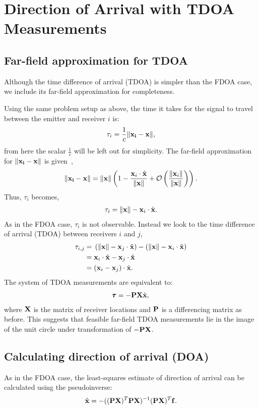 \section{Direction of Arrival with TDOA Measurements}
\label{s:TDOA}
\subsection{Far-field approximation for TDOA}
Although the time difference of arrival (TDOA) is simpler than the FDOA case, we include its far-field approximation for completeness.

Using the same problem setup as above, the time it takes for the signal to travel between the emitter and receiver $i$ is:
\begin{align*}
  \tau_{i} = \frac{1}{c}\|\mathbf{x_i}-\mathbf{x}\|,
\end{align*}
from here the scalar $\frac{1}{c}$ will be left out for simplicity.
The far-field approximation for $\|\mathbf{x_i}-\mathbf{x}\|$ is given~\cite{Cheney2009},
\begin{align*}
  \|\mathbf{x_i}-\mathbf{x}\|=\|\mathbf{x}\|\left(1-\frac{\mathbf{x}_i\cdot\hat{\mathbf{x}}}{\|\mathbf{x}\|}+\mathcal{O}\left( \frac{\|\mathbf{x}_i\|}{\|\mathbf{x}\|}\right) \right).
\end{align*}
Thus, $\tau_{i}$ becomes,
\begin{align*}
  \tau_{i} = \|\mathbf{x}\| - \mathbf{x}_i\cdot\hat{\mathbf{x}}.
\end{align*}
As in the FDOA case, $\tau_i$ is not observable. Instead we look to the time difference of arrival (TDOA) between receivers $i$ and $j$,
\begin{align*}
  \tau_{i,j} =& \; \left(\|\mathbf{x}\| - \mathbf{x}_j\cdot\hat{\mathbf{x}}\right) - \left(\|\mathbf{x}\| - \mathbf{x}_i\cdot\hat{\mathbf{x}}\right) \\
            =& \; \mathbf{x}_i\cdot\hat{\mathbf{x}} - \mathbf{x}_j\cdot\hat{\mathbf{x}} \\
            =& \; (\mathbf{x}_i-\mathbf{x}_j)\cdot\hat{\mathbf{x}}.
\end{align*}
The system of TDOA measurements are equivalent to:
\begin{align}
  \pmb{\tau} = -\mathbf{PX}\hat{\mathbf{x}},
\end{align}
where $\mathbf{X}$ is the matrix of receiver locations and $\mathbf{P}$ is a differencing matrix as before. This suggests that feasible far-field TDOA measurements lie in the image of the unit circle under transformation of $-\mathbf{PX}$.

\subsection{Calculating direction of arrival (DOA)}
As in the FDOA case, the least-squares estimate of direction of arrival can be calculated using the pseudoinverse:
\begin{align}
    \label{eq:doa_t}
  \hat{\mathbf{x}} = -((\mathbf{PX})^T\mathbf{PX})^{-1}(\mathbf{PX})^T\mathbf{f}.
\end{align}
